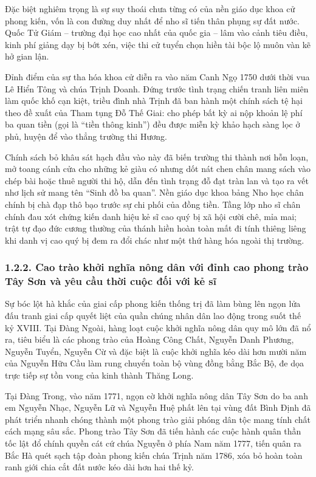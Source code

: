 Đặc biệt nghiêm trọng là sự suy thoái chưa từng có của nền giáo dục khoa cử phong kiến, vốn là con đường duy nhất để nho sĩ tiến thân phụng sự đất nước. Quốc Tử Giám -- trường đại học cao nhất của quốc gia -- lâm vào cảnh tiêu điều, kinh phí giảng dạy bị bớt xén, việc thi cử tuyển chọn hiền tài bộc lộ muôn vàn kẽ hở gian lận.

Đỉnh điểm của sự tha hóa khoa cử diễn ra vào năm Canh Ngọ 1750 dưới thời vua Lê Hiển Tông và chúa Trịnh Doanh. Đứng trước tình trạng chiến tranh liên miên làm quốc khố cạn kiệt, triều đình nhà Trịnh đã ban hành một chính sách tệ hại theo đề xuất của Tham tụng Đỗ Thế Giai: cho phép bất kỳ ai nộp khoản lệ phí ba quan tiền (gọi là ``tiền thông kinh'') đều được miễn kỳ khảo hạch sàng lọc ở phủ, huyện để vào thẳng trường thi Hương.

Chính sách bỏ khâu sát hạch đầu vào này đã biến trường thi thành nơi hỗn loạn, mở toang cánh cửa cho những kẻ giàu có nhưng dốt nát chen chân mang sách vào chép bài hoặc thuê người thi hộ, dẫn đến tình trạng đỗ đạt tràn lan và tạo ra vết nhơ lịch sử mang tên ``Sinh đồ ba quan''. Nền giáo dục khoa bảng Nho học chân chính bị chà đạp thô bạo trước sự chi phối của đồng tiền. Tầng lớp nho sĩ chân chính đau xót chứng kiến danh hiệu kẻ sĩ cao quý bị xã hội cười chê, mỉa mai; trật tự đạo đức cương thường của thánh hiền hoàn toàn mất đi tính thiêng liêng khi danh vị cao quý bị đem ra đổi chác như một thứ hàng hóa ngoài thị trường.

\subsubsection*{1.2.2. Cao trào khởi nghĩa nông dân với đỉnh cao phong trào Tây Sơn và yêu cầu thời cuộc đối với kẻ sĩ}

Sự bóc lột hà khắc của giai cấp phong kiến thống trị đã làm bùng lên ngọn lửa đấu tranh giai cấp quyết liệt của quần chúng nhân dân lao động trong suốt thế kỷ XVIII. Tại Đàng Ngoài, hàng loạt cuộc khởi nghĩa nông dân quy mô lớn đã nổ ra, tiêu biểu là các phong trào của Hoàng Công Chất, Nguyễn Danh Phương, Nguyễn Tuyển, Nguyễn Cừ và đặc biệt là cuộc khởi nghĩa kéo dài hơn mười năm của Nguyễn Hữu Cầu làm rung chuyển toàn bộ vùng đồng bằng Bắc Bộ, đe dọa trực tiếp sự tồn vong của kinh thành Thăng Long.

Tại Đàng Trong, vào năm 1771, ngọn cờ khởi nghĩa nông dân Tây Sơn do ba anh em Nguyễn Nhạc, Nguyễn Lữ và Nguyễn Huệ phất lên tại vùng đất Bình Định đã phát triển nhanh chóng thành một phong trào giải phóng dân tộc mang tính chất cách mạng sâu sắc. Phong trào Tây Sơn đã tiến hành các cuộc hành quân thần tốc lật đổ chính quyền cát cứ chúa Nguyễn ở phía Nam năm 1777, tiến quân ra Bắc Hà quét sạch tập đoàn phong kiến chúa Trịnh năm 1786, xóa bỏ hoàn toàn ranh giới chia cắt đất nước kéo dài hơn hai thế kỷ.

